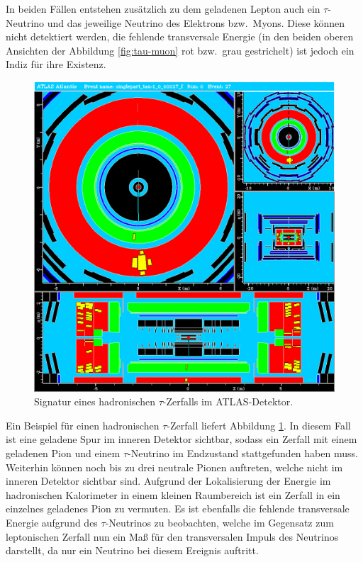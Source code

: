 \documentclass[11pt, a4paper]{article}
\numberwithin{equation}{section}
\begin{document}
In beiden Fällen entstehen zusätzlich zu dem geladenen Lepton auch ein $\tau$-Neutrino und das jeweilige Neutrino des Elektrons bzw.\ Myons.
Diese können nicht detektiert werden, die fehlende transversale Energie (in den beiden oberen Ansichten der Abbildung \ref{fig:tau-muon} rot bzw.\ grau gestrichelt) ist jedoch ein Indiz für ihre Existenz.
\vfill

\clearpage
\begin{figure}[htbp]
	\centering
	\includegraphics[width=1.0\textwidth]{./data/atlantis/singlepart_events_new/tau/single_pion.png}
	\caption{Signatur eines hadronischen $\tau$-Zerfalls im ATLAS-Detektor.}
	\label{fig:tau-pion}
\end{figure}
\vfill
\noindent
Ein Beispiel für einen hadronischen $\tau$-Zerfall liefert Abbildung \ref{fig:tau-pion}.
In diesem Fall ist eine geladene Spur im inneren Detektor sichtbar, sodass ein Zerfall mit einem geladenen Pion und einem $\tau$-Neutrino im Endzustand stattgefunden haben muss.
Weiterhin können noch bis zu drei neutrale Pionen auftreten, welche nicht im inneren Detektor sichtbar sind.
Aufgrund der Lokalisierung der Energie im hadronischen Kalorimeter in einem kleinen Raumbereich ist ein Zerfall in ein einzelnes geladenes Pion zu vermuten.
Es ist ebenfalls die fehlende transversale Energie aufgrund des $\tau$-Neutrinos zu beobachten, welche im Gegensatz zum leptonischen Zerfall nun ein Maß für den transversalen Impuls des Neutrinos darstellt, da nur ein Neutrino bei diesem Ereignis auftritt.
\vfill
\end{document}
